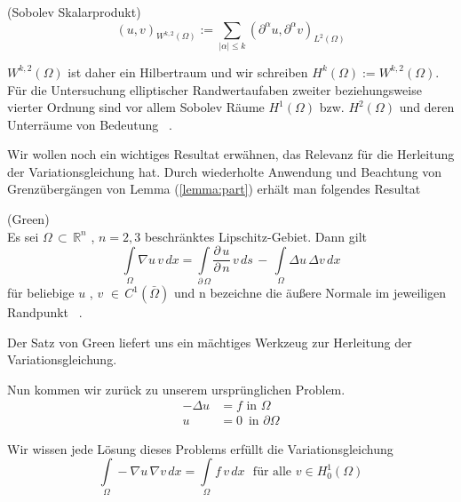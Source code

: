 \begin{Definition} (Sobolev Skalarprodukt) \\
\begin{equation*}
(u,v)_{{W^{{k,2}}(\Omega )}}:=\sum _{{|\alpha |\leq k}}(\partial ^{\alpha }u,\partial ^{\alpha }v)_{{L^{2}(\Omega )}}
\end{equation*}
\end{Definition}

$W^{{k,2}}(\Omega )$ ist daher ein Hilbertraum und wir schreiben $H^{k}(\Omega ):=W^{{k,2}}(\Omega )$.
Für die Untersuchung elliptischer Randwertaufaben zweiter beziehungsweise vierter Ordnung sind vor allem Sobolev Räume $H^1(\Omega)$ bzw. $H^2(\Omega)$ und deren Unterräume von Bedeutung ~\cite[134]{Numerik}. 

Wir wollen noch ein wichtiges Resultat erwähnen, das Relevanz für die Herleitung der Variationsgleichung hat.
Durch wiederholte Anwendung und Beachtung von Grenzübergängen von Lemma (\ref{lemma:part}) erhält man folgendes Resultat

\begin{Satz} (Green) \\
Es sei $\Omega \, \subset \, \mathbb{R}^{n}$ , $n=2,3$ beschränktes Lipschitz-Gebiet. Dann gilt
\begin{equation*}
\int\limits_{\Omega} \nabla u \, v \, dx = \int\limits_{\partial \, \Omega} \dfrac{\partial \, u}{\partial \, n} \, v \, ds \, - \,
\int\limits_{\Omega} \Delta u \, \Delta v \, dx
\end{equation*}
für beliebige $u$ , $v$ $\in \, C^1(\bar{\Omega})$ und n bezeichne die äußere Normale im jeweiligen Randpunkt ~\cite[140]{Numerik}.
\end{Satz}
Der Satz von Green liefert uns ein mächtiges Werkzeug zur Herleitung der Variationsgleichung.

Nun kommen wir zurück zu unserem ursprünglichen Problem.
\begin{equation*} 
\begin{aligned}
	- \Delta u &= f \text{ in } \Omega \\
	u &= 0 \, \text{ in } \partial \Omega	
\end{aligned}
\end{equation*}

Wir wissen jede Lösung dieses Problems erfüllt die Variationsgleichung
\begin{equation}  \label{eq:vary}
\int\limits_{\Omega} - \nabla u \, \nabla v \, dx = \int\limits_{\Omega} f \, v \, dx \, \, \text{ für alle } v \in H^1_0(\Omega)
\end{equation}


